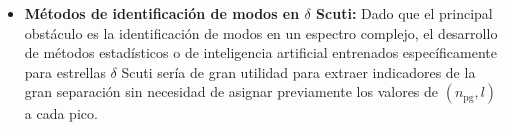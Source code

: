\begin{itemize}
  \item \textbf{Métodos de identificación de modos en $\delta$ Scuti:} Dado que el principal obstáculo es la identificación de modos en un espectro complejo, el desarrollo de métodos estadísticos o de inteligencia artificial entrenados específicamente para estrellas $\delta$ Scuti sería de gran utilidad para extraer indicadores de la gran separación sin necesidad de asignar previamente los valores de $(n_{\mathrm{pg}}, l)$ a cada pico.

\end{itemize}